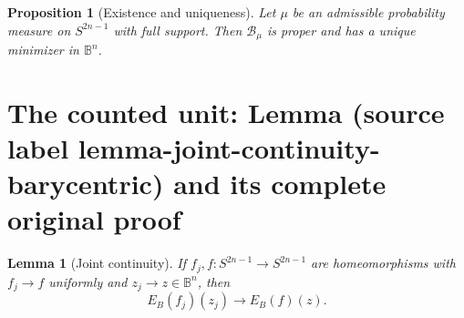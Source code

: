 \documentclass[10pt,a4paper]{amsart}
\newcommand{\B}{\mathbb B}
\theoremstyle{plain}
\newtheorem{proposition}[theorem]{Proposition}
\newtheorem{lemma}[theorem]{Lemma}
\theoremstyle{definition}
\theoremstyle{remark}
\theoremstyle{definition}
\begin{document}
\begin{proposition}[Existence and uniqueness]\label{existence-uniqueness-barycenter}
Let \(\mu\) be an admissible probability measure on \(S^{2n-1}\) with full
support.  Then \(\mathcal B_\mu\) is proper and has a unique minimizer in
\(\B^n\).
\end{proposition}


\section{The counted unit: Lemma (source label lemma-joint-continuity-barycentric) and its complete original proof}

\begin{lemma}[Joint continuity]
\label{lemma-joint-continuity-barycentric}
If \(f_j,f:S^{2n-1}\to S^{2n-1}\) are homeomorphisms with
\(f_j\to f\) uniformly and \(z_j\to z\in\B^n\), then
\[
        E_B(f_j)(z_j)\longrightarrow E_B(f)(z).
\]
\end{lemma}
\end{document}
